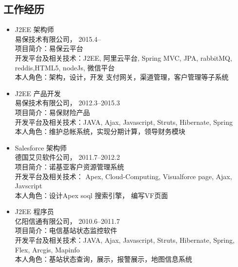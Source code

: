 \documentclass{res}
\begin{document}
\begin{CJK}{UTF8}{song}
\begin{resume}
    \section{工作经历}
    \begin{itemize}
    \item{ J2EE 架构师}\\
      { 易保技术有限公司}， \hfill 2015.4--\\
      项目简介：易保云平台\\
      开发平台及相关技术：J2EE, 阿里云平台, Spring MVC, JPA,
      rabbitMQ, reddis,HTML5, nodeJs, 微信平台\\
      本人角色：架构，设计，开发 支付网关，渠道管理，客户管理等子系统\\
    \item{ J2EE 产品开发}\\
      { 易保技术有限公司}， \hfill 2012.3--2015.3\\
      项目简介：易保财险产品\\
      开发平台及相关技术：JAVA, Ajax, Javascript, Struts, Hibernate, Spring\\
      本人角色：维护总帐系统，实现分期计算，领导财务模块\\
    \item{ Salesforce 架构师}\\
      { 德国艾贝软件公司}， \hfill 2011.7--2012.2\\
      项目简介：诺基亚客户资源管理系统\\
      开发平台及相关技术： Apex, Cloud-Computing, Visualforce page, Ajax, Javscript\\
      本人角色：设计Apex soql 搜索引擎， 编写VF页面\\
    \item{ J2EE 程序员}\\
      { 亿阳信通有限公司}， \hfill 2010.6--2011.7\\
      项目简介：电信基站状态监控软件\\
      开发平台及相关技术：JAVA, Ajax, Javascript, Struts, Hibernate, Spring, Flex, Arcgis, Mapinfo\\
      本人角色：基站状态查询，展示，报警展示，地图信息系统\\

\end{itemize}
\end{resume}
\end{CJK}
\end{document}
